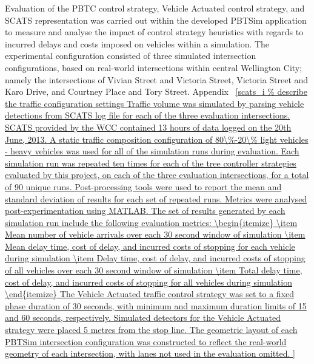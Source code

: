 Evaluation of the PBTC control strategy, Vehicle Actuated control strategy, and SCATS representation was carried out within the developed PBTSim application to measure and analyse the impact of control strategy heuristics with regards to incurred delays and costs imposed on vehicles within a simulation. The experimental configuration consisted of three simulated intersection configurations, based on real-world intersections within central Wellington City; namely the intersections of Vivian Street and Victoria Street, Victoria Street and Karo Drive, and Courtney Place and Tory Street. Appendix ~\ref{scats_i

Traffic volume was simulated by parsing vehicle detections from SCATS log file for each of the three evaluation intersections. SCATS provided by the WCC contained 13 hours of data logged on the 20th June, 2013. A static traffic composition configuration of 80\%-20\% light vehicles - heavy vehicles was used for all of the simulation runs during evaluation.

Each simulation run was repeated ten times for each of the tree controller strategies evaluated by this project, on each of the three evaluation intersections, for a total of 90 unique runs. Post-processing tools were used to report the mean and standard deviation of results for each set of repeated runs. Metrics were analysed post-experimentation using MATLAB. The set of results generated by each simulation run include the following evaluation metrics:

\begin{itemize}
\item Mean number of vehicle arrivals over each 30 second window of simulation
\item Mean delay time, cost of delay, and incurred costs of stopping for each vehicle during simulation
\item Delay time, cost of delay, and incurred costs of stopping of all vehicles over each 30 second window of simulation
\item Total delay time, cost of delay, and incurred costs of stopping for all vehicles during simulation
\end{itemize}

The Vehicle Actuated traffic control strategy was set to a fixed phase duration of 30 seconds, with minimum and maximum duration limits of 15 and 60 seconds, respectively. Simulated detectors for the Vehicle Actuated strategy were placed 5 metres from the stop line. The geometric layout of each PBTSim intersection configuration was constructed to reflect the real-world geometry of each intersection, with lanes not used in the evaluation omitted. 

}
